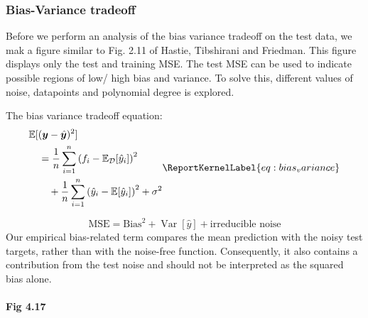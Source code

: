 \documentclass[aps,rmp,reprint,raggedbottom,amsmath,amssymb,longbibliography]{revtex4-1}
\let\label\ReportKernelLabel
\begin{document}
\subsubsection{Bias-Variance tradeoff}
\label{sec:BV}
Before we perform an analysis of the bias variance tradeoff on the test data,
we mak a figure similar to Fig. 2.11 of Hastie, Tibshirani and Friedman. \cite[p.~38]{StatisticalLearning}
This figure displays only the test and training MSE. The test MSE
can be used to indicate possible regions of low/ high bias and variance.
To solve this, different values of noise, datapoints and polynomial degree is explored.

The bias variance tradeoff equation:
\begin{equation}
  \begin{aligned}
  &\mathbb{E}[
    (\boldsymbol{y}-\hat{\boldsymbol{y}})^2] \\
    &\quad = \frac{1}{n}\sum_{i=1}^{n}
    \left(f_i-\mathbb{E}_{\mathcal{D}}[\hat{y}_i]\right)^2
    \\
    &\qquad + \frac{1}{n}\sum_{i=1}^{n}
    \left(
        \hat{y}_i-\mathbb{E}[\hat{y}_i]
    \right)^2 + \sigma^2
  \end{aligned}
  \label{eq:bias_variance}
\end{equation}

\begin{equation}
  \mathrm{MSE} = \mathrm{Bias}^2 + \operatorname{Var}[\hat{y}]
  + \text{irreducible noise}
\end{equation}
Our empirical bias-related term compares the mean
prediction with the noisy test targets,
rather than with the noise-free function.
Consequently, it also contains a contribution from
the test noise and should not be interpreted as
the squared bias alone.

\paragraph{Fig 4.17}
\end{document}
